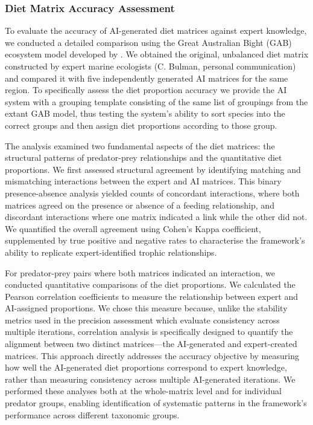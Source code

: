 \subsubsection{Diet Matrix Accuracy Assessment}
\label{sec:accuracy_assessment}
To evaluate the accuracy of AI-generated diet matrices against expert knowledge, we conducted a detailed comparison using the Great Australian Bight (GAB) ecosystem model developed by \citet{Fulton2018}. We obtained the original, unbalanced diet matrix constructed by expert marine ecologists (C. Bulman, personal communication) and compared it with five independently generated AI matrices for the same region. To specifically assess the diet proportion accuracy we provide the AI system with a grouping template consisting of the same list of groupings from the extant GAB model, thus testing the system's ability to sort species into the correct groups and then assign diet proportions according to those group.

The analysis examined two fundamental aspects of the diet matrices: the structural patterns of predator-prey relationships and the quantitative diet proportions. We first assessed structural agreement by identifying matching and mismatching interactions between the expert and AI matrices. This binary presence-absence analysis yielded counts of concordant interactions, where both matrices agreed on the presence or absence of a feeding relationship, and discordant interactions where one matrix indicated a link while the other did not. We quantified the overall agreement using Cohen's Kappa coefficient, supplemented by true positive and negative rates to characterise the framework's ability to replicate expert-identified trophic relationships.

For predator-prey pairs where both matrices indicated an interaction, we conducted quantitative comparisons of the diet proportions. We calculated the Pearson correlation coefficients to measure the relationship between expert and AI-assigned proportions. We chose this measure because, unlike the stability metrics used in the precision assessment which evaluate consistency across multiple iterations, correlation analysis is specifically designed to quantify the alignment between two distinct matrices—the AI-generated and expert-created matrices. This approach directly addresses the accuracy objective by measuring how well the AI-generated diet proportions correspond to expert knowledge, rather than measuring consistency across multiple AI-generated iterations. We performed these analyses both at the whole-matrix level and for individual predator groups, enabling identification of systematic patterns in the framework's performance across different taxonomic groups.
